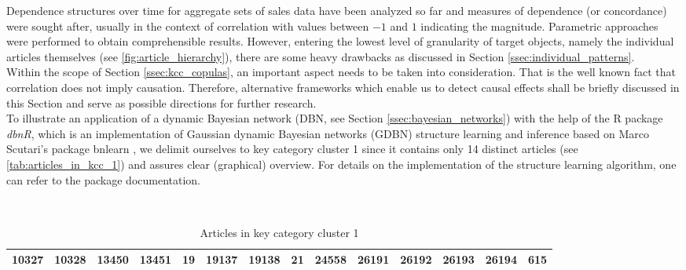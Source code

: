 
Dependence structures over time for aggregate sets of sales data have been analyzed so far and measures of dependence (or concordance) were sought after, usually in the context of correlation with values between $-1$ and $1$ indicating the magnitude. Parametric approaches were performed to obtain comprehensible results. However, entering the lowest level of granularity of target objects, namely the individual articles themselves (see \autoref{fig:article_hierarchy}), there are some heavy drawbacks as discussed in Section \ref{ssec:individual_patterns}.
\\

Within the scope of Section \ref{ssec:kcc_copulas}, an important aspect needs to be taken into consideration. That is the well known fact that correlation does not imply causation. Therefore, alternative frameworks which enable us to detect causal effects shall be briefly discussed in this Section and serve as possible directions for further research.
\\
To illustrate an application of a dynamic Bayesian network (\ac{DBN}, see Section \ref{ssec:bayesian_networks}) with the help of the R package \textit{dbnR}, which is an implementation of Gaussian dynamic Bayesian networks (GDBN) structure learning and inference based on Marco Scutari’s package bnlearn \citep{bnlearn_package}, we delimit ourselves to key category cluster 1 since it contains only 14 distinct articles (see \autoref{tab:articles_in_kcc_1}) and assures clear (graphical) overview. 
For details on the implementation of the structure learning algorithm, one can refer to the package documentation.
\\

\begin{table}[H]
\setlength\arrayrulewidth{1pt}  
\centering
\begin{adjustbox}{max width=\textwidth}\
\begin{tabular}{|c|c|c|c|c|c|c|c|c|c|c|c|c|c|}
\hline
10327 & 10328 & 13450 & 13451 & 19 & 19137 & 19138 & 21 & 24558 & 26191 & 26192 & 26193 & 26194 & 615 \\ \hline
\end{tabular}
\end{adjustbox}
\caption{Articles in key category cluster 1}
\label{tab:articles_in_kcc_1}
\end{table}








